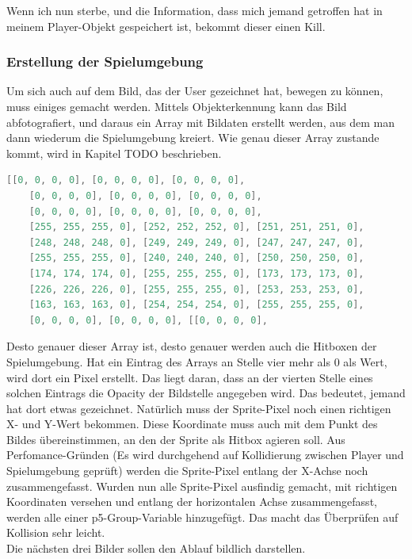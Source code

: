 Wenn ich nun sterbe, und die Information, dass mich jemand getroffen hat in meinem Player-Objekt gespeichert ist, bekommt dieser einen Kill. 



\subsubsection{Erstellung der Spielumgebung} \label{impl:Spielumgebung}
Um sich auch auf dem Bild, das der User gezeichnet hat, bewegen zu können, muss einiges gemacht werden. Mittels Objekterkennung kann das Bild abfotografiert, 
und daraus ein Array mit Bildaten erstellt werden, aus dem man dann wiederum die Spielumgebung kreiert. Wie genau dieser Array zustande kommt, wird in Kapitel TODO beschrieben.
\\
\begin{lstlisting}[caption=Vereinfachte Darstellung eines Bilddaten-Arrays,language=Java,label=lst:impl:bilddaten]
    [[0, 0, 0, 0], [0, 0, 0, 0], [0, 0, 0, 0],
    [0, 0, 0, 0], [0, 0, 0, 0], [0, 0, 0, 0],
    [0, 0, 0, 0], [0, 0, 0, 0], [0, 0, 0, 0],
    [255, 255, 255, 0], [252, 252, 252, 0], [251, 251, 251, 0],
    [248, 248, 248, 0], [249, 249, 249, 0], [247, 247, 247, 0],
    [255, 255, 255, 0], [240, 240, 240, 0], [250, 250, 250, 0],
    [174, 174, 174, 0], [255, 255, 255, 0], [173, 173, 173, 0],
    [226, 226, 226, 0], [255, 255, 255, 0], [253, 253, 253, 0],
    [163, 163, 163, 0], [254, 254, 254, 0], [255, 255, 255, 0],
    [0, 0, 0, 0], [0, 0, 0, 0], [[0, 0, 0, 0],
\end{lstlisting}

Desto genauer dieser Array ist, desto genauer werden auch die Hitboxen der Spielumgebung.
Hat ein Eintrag des Arrays an Stelle vier mehr als 0 als Wert, wird dort ein Pixel erstellt. Das liegt daran, dass an der vierten Stelle eines solchen Eintrags die Opacity der Bildstelle angegeben wird. Das bedeutet, jemand hat dort etwas gezeichnet.
Natürlich muss der Sprite-Pixel noch einen richtigen X- und Y-Wert bekommen. Diese Koordinate muss auch mit dem Punkt des Bildes übereinstimmen, an den der Sprite als Hitbox agieren soll.
Aus Perfomance-Gründen (Es wird durchgehend auf Kollidierung zwischen Player und Spielumgebung geprüft) werden die Sprite-Pixel entlang der X-Achse noch zusammengefasst.
Wurden nun alle Sprite-Pixel ausfindig gemacht, mit richtigen Koordinaten versehen und entlang der horizontalen Achse zusammengefasst, werden alle einer p5-Group-Variable hinzugefügt.
Das macht das Überprüfen auf Kollision sehr leicht. \\
Die nächsten drei Bilder sollen den Ablauf bildlich darstellen.

